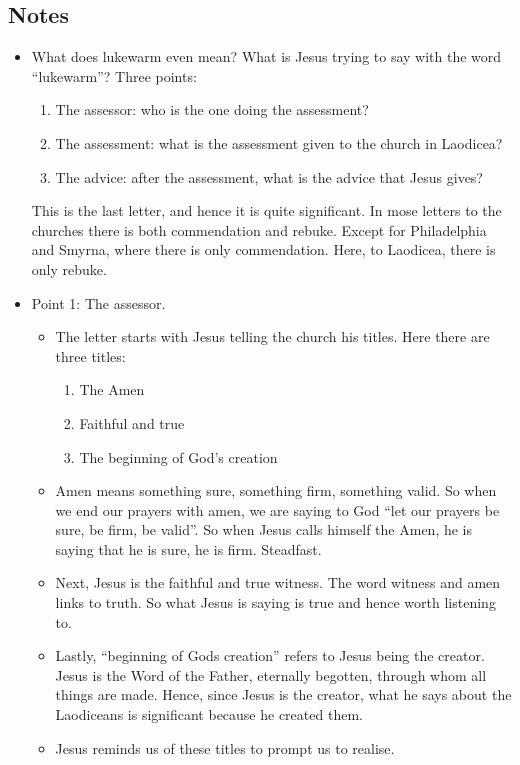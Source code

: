 \subsection*{Notes}
\begin{itemize}
  \item{What does lukewarm even mean? What is Jesus trying to say with the word ``lukewarm''? Three points:
  \begin{enumerate}
    \item{The assessor: who is the one doing the assessment?}
    \item{The assessment: what is the assessment given to the church in Laodicea?}
    \item{The advice: after the assessment, what is the advice that Jesus gives?}
  \end{enumerate}
  This is the last letter, and hence it is quite significant. In mose letters to the churches there is both commendation and rebuke. Except for Philadelphia and Smyrna, where there is only commendation. Here, to Laodicea, there is only rebuke.}
  \item{Point 1: The assessor.
  \begin{itemize}
    \item{The letter starts with Jesus telling the church his titles.  Here
    there are three titles:
    \begin{enumerate}
      \item{The Amen}
      \item{Faithful and true}
      \item{The beginning of God's creation}
    \end{enumerate}}
    \item{Amen means something sure, something firm, something valid.  So
    when we end our prayers with amen, we are saying to God “let our prayers
    be sure, be firm, be valid”.  So when Jesus calls himself the Amen, he is
    saying that he is sure, he is firm.  Steadfast.}
    \item{Next, Jesus is the faithful and true witness.  The word witness and
    amen links to truth.  So what Jesus is saying is true and hence worth
    listening to.}
    \item{Lastly, “beginning of Gods creation” refers to Jesus being the
    creator.  Jesus is the Word of the Father, eternally begotten, through
    whom all things are made.  Hence, since Jesus is the creator, what he
    says about the Laodiceans is significant because he created them.}
    \item{Jesus reminds us of these titles to prompt us to realise.
}
\end{itemize}}
\end{itemize}
